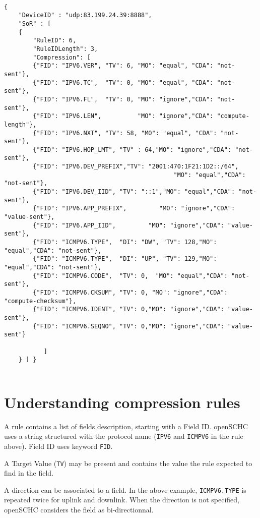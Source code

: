 \begin{lstlisting}[basicstyle=\ttfamily\tiny, caption={rule 6/3 for ping traffic}, caption=fig-rule-ping, backgroundcolor=\color{yellow}]

{
    "DeviceID" : "udp:83.199.24.39:8888",
    "SoR" : [
	{
	    "RuleID": 6,
	    "RuleIDLength": 3,
	    "Compression": [
		{"FID": "IPV6.VER", "TV": 6, "MO": "equal", "CDA": "not-sent"},
		{"FID": "IPV6.TC",  "TV": 0, "MO": "equal", "CDA": "not-sent"},
		{"FID": "IPV6.FL",  "TV": 0, "MO": "ignore","CDA": "not-sent"},
		{"FID": "IPV6.LEN",          "MO": "ignore","CDA": "compute-length"},
		{"FID": "IPV6.NXT", "TV": 58, "MO": "equal", "CDA": "not-sent"},
		{"FID": "IPV6.HOP_LMT", "TV" : 64,"MO": "ignore","CDA": "not-sent"},
		{"FID": "IPV6.DEV_PREFIX","TV": "2001:470:1F21:1D2::/64",
                                               "MO": "equal","CDA": "not-sent"},
		{"FID": "IPV6.DEV_IID", "TV": "::1","MO": "equal","CDA": "not-sent"},
		{"FID": "IPV6.APP_PREFIX",         "MO": "ignore","CDA": "value-sent"},
		{"FID": "IPV6.APP_IID",         "MO": "ignore","CDA": "value-sent"},
		{"FID": "ICMPV6.TYPE",  "DI": "DW", "TV": 128,"MO": "equal","CDA": "not-sent"},
		{"FID": "ICMPV6.TYPE",  "DI": "UP", "TV": 129,"MO": "equal","CDA": "not-sent"},
		{"FID": "ICMPV6.CODE",  "TV": 0,  "MO": "equal","CDA": "not-sent"},
		{"FID": "ICMPV6.CKSUM", "TV": 0, "MO": "ignore","CDA": "compute-checksum"},
		{"FID": "ICMPV6.IDENT", "TV": 0,"MO": "ignore","CDA": "value-sent"},
		{"FID": "ICMPV6.SEQNO", "TV": 0,"MO": "ignore","CDA": "value-sent"}
		
	       ]
	} ] }
	
\end{lstlisting}



\section{Understanding compression rules}

A rule contains a list of fields description, starting with a Field ID. openSCHC uses a string structured with the protocol name (\texttt{IPV6} and \texttt{ICMPV6} in the rule above). Field ID uses keyword \texttt{FID}.

A Target Value (\texttt{TV}) may be present and contains the value the rule expected to find in the field.

A direction can be associated to a field. In the above example, \texttt{ICMPV6.TYPE} is repeated twice for uplink and downlink. When the direction is not specified, openSCHC considers the field as bi-directionnal.

